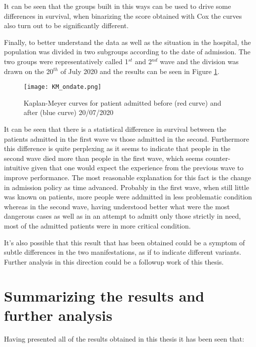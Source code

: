 It can be seen that the groups built in this ways can be used to drive some differences in survival, when binarizing the score obtained with Cox the curves also turn out to be significantly different.

Finally, to better understand the data as well as the situation in the hospital,  the population was divided in two subgroups according to the date of admission. 
The two groups were representatively called 1$^{st}$ and 2$^{nd}$ wave and the division was drawn on the 20$^{th}$ of July 2020 and the results can be seen in Figure \ref{fig:kmwaves}.

\begin{figure}
\texttt{[image: KM\_ondate.png]}
\caption{Kaplan-Meyer curves for patient admitted before (red curve) and after (blue curve) 20/07/2020 \label{fig:kmwaves}}
\end{figure}

It can be seen that there is a statistical difference in survival between the patients admitted in the first wave vs those admitted in the second. 
Furthermore this difference is quite perplexing as it seems to indicate that people in the second wave died more than people in the first wave, which seems counter-intuitive given that one would expect the experience from the previous wave to improve performance.
The most reasonable explanation for this fact is the change in admission policy as time advanced.
Probably in the first wave, when still little was known on \covid patients, more people were addmitted in less problematic condition whereas in the second wave, having understood better what were the most dangerous cases as well as in an attempt to admitt only those  strictly in need, most of the admitted patients were in more critical condition.

It's also possible that this result that has been obtained could be a symptom of subtle differences in the two \covid manifestations, as if to indicate different variants.
Further analysis in this direction could be a followup work of this thesis.

\section{Summarizing the results and further analysis}
Having presented all of the results obtained in this thesis it has been seen that:

